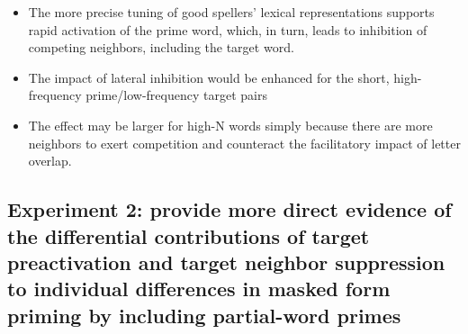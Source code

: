 \documentclass[]{article}
\begin{document}
\begin{itemize}
				\item The more precise tuning of good spellers’ lexical representations supports rapid activation of the prime word, which, in turn, leads to inhibition of competing neighbors, including the target word.
				\item The impact of lateral inhibition would be enhanced for the short, high-frequency prime/low-frequency target pairs
				\item The effect may be larger for high-N words simply because there are more neighbors to exert competition and counteract the facilitatory impact of letter overlap. 
			\end{itemize}
	
		\subsection{Experiment 2: provide more direct evidence of the differential contributions of target preactivation and target neighbor suppression to individual differences in masked form priming by including partial-word primes}
\end{document}
